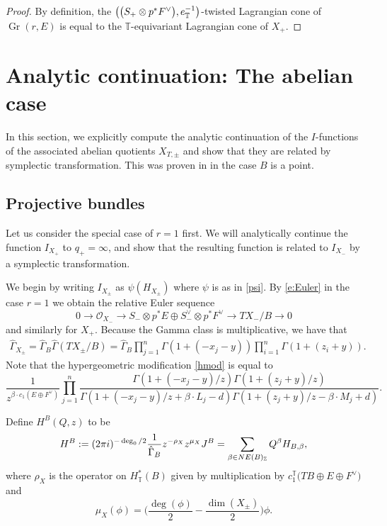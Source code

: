 \documentclass[11pt]{article}
\numberwithin{equation}{section}
\numberwithin{equation}{section}
\newcommand{\cc}[1]{\mathcal{#1}} %
\newcommand{\ZZ}{\mathbb{Z}}
\newcommand{\torus}{\mathbb{T}}
\DeclareMathOperator{\Gr}{Gr}
\newcommand{\F}{F}
\newcommand{\E}{E}
\newcommand{\MB}{M}
\newcommand{\LB}{L}
\newcommand{\z}{z}
\newcommand{\x}{x}
\newcommand{\y}{y}
\begin{document}
\begin{proof}
By definition, the $\bigl(\bigl(S_+ \otimes p^*\F^\vee\bigr), {\rm e}^{-1}_{\torus}\bigr)$-twisted Lagrangian cone of $\Gr(r, \E)$ is equal to the $\torus$-equivariant Lagrangian cone of $X_+$.
\end{proof}

\section{Analytic continuation: The abelian case}

In this section, we explicitly compute the analytic continuation of the $I$-functions of the associated abelian quotients $X_{T, \pm}$ and show that they are related by symplectic transformation. This was proven in \cite{CIJ} in the case $B$ is a point.

\subsection{Projective bundles}
Let us consider the special case of $r=1$ first. We will analytically continue the function $I_{X_+}$ to $q_+ = \infty$, and show that the resulting function is related to $I_{X_-}$ by a symplectic transformation.

We begin by writing $I_{X_\pm}$ as $\psi (H_{X_\pm})$ where $\psi$ is as in \eqref{psi}.
By \eqref{e:Euler} in the case $r=1$ we obtain the relative Euler sequence
\[
0 \to \cc O_{X_-} \to S_- \otimes p^*E \oplus S_-^\vee \otimes p^*F^\vee \to TX_{-}/B \to 0
\]
and similarly for $X_+$.
Because the Gamma class is multiplicative, we have that
\begin{align*}
\hat \Gamma_{X_\pm} = \hat \Gamma_{B} \hat \Gamma(TX_\pm/B)
 =\hat \Gamma_{B} \prod_{j=1}^n \Gamma(1 + (- \x_j - \y)) \prod_{i=1}^n \Gamma(1 + (\z_i + \y)).
\end{align*}
Note that the hypergeometric modification \eqref{hmod} is equal to
\begin{equation*}\frac{1}{z^{\beta \cdot c_1(\E \oplus \F^\vee)}}\prod_{j=1}^n\frac{ \Gamma(1 + (- \x_j - \y)/z) \Gamma(1 + (\z_j + \y)/z)}{ \Gamma(1 + (- \x_j - \y)/z + \beta \cdot \LB_j-d) \Gamma(1 + (\z_j + \y)/z - \beta \cdot \MB_j + d)}.
\end{equation*}

Define $H^B(Q ,z)$ to be
\begin{align*} H^B := (2 \pi {\rm i})^{-\deg_0/2}\frac{1}{\hat \Gamma_B} z^{- \rho_{X}} z^{\mu_{X}} J^B
 =
\sum_{\beta \in NE(B)_\ZZ} Q^\beta H_{B, \beta},\end{align*}
where $\rho_{X}$ is the operator on $H^*_\torus(B)$ given by multiplication by
$c_1^\torus\bigl(TB \oplus E \oplus F^\vee\bigr)$ and
\[
\mu_{X}(\phi) = \biggl( \frac{\deg(\phi)}{2} -\frac{ \dim(X_\pm)}{2} \biggr) \phi.
\]
\end{document}

